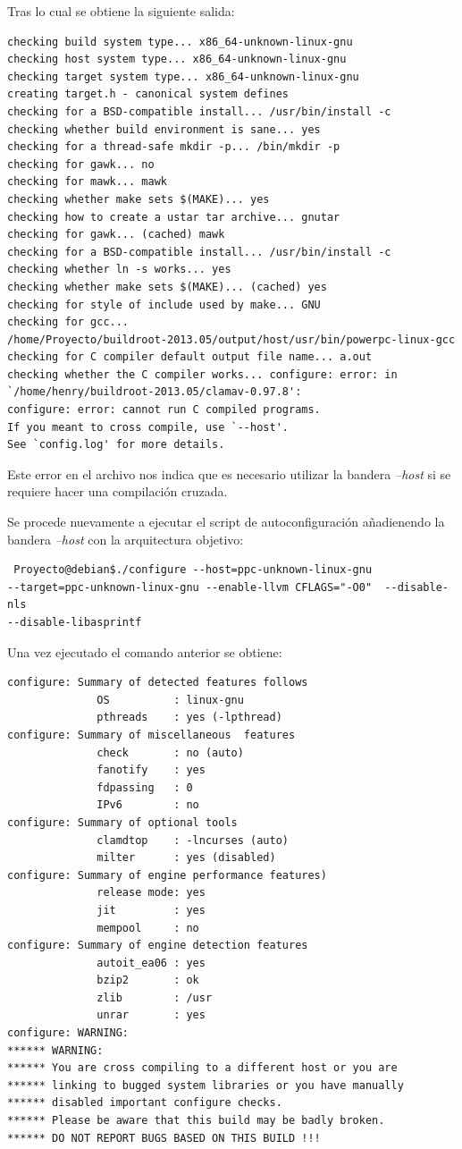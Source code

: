 Tras lo cual se obtiene la siguiente salida:
\begin{verbatim}
checking build system type... x86_64-unknown-linux-gnu
checking host system type... x86_64-unknown-linux-gnu
checking target system type... x86_64-unknown-linux-gnu
creating target.h - canonical system defines
checking for a BSD-compatible install... /usr/bin/install -c
checking whether build environment is sane... yes
checking for a thread-safe mkdir -p... /bin/mkdir -p
checking for gawk... no
checking for mawk... mawk
checking whether make sets $(MAKE)... yes
checking how to create a ustar tar archive... gnutar
checking for gawk... (cached) mawk
checking for a BSD-compatible install... /usr/bin/install -c
checking whether ln -s works... yes
checking whether make sets $(MAKE)... (cached) yes
checking for style of include used by make... GNU
checking for gcc... 
/home/Proyecto/buildroot-2013.05/output/host/usr/bin/powerpc-linux-gcc
checking for C compiler default output file name... a.out
checking whether the C compiler works... configure: error: in 
`/home/henry/buildroot-2013.05/clamav-0.97.8':
configure: error: cannot run C compiled programs.
If you meant to cross compile, use `--host'.
See `config.log' for more details.
\end{verbatim}


Este error en el archivo nos indica que  es necesario utilizar la bandera 
\emph{--host} si se requiere hacer una compilación cruzada.

Se procede nuevamente a  ejecutar el script  de autoconfiguración añadienendo 
la bandera \emph{--host} con la arquitectura objetivo:

\begin{verbatim}
 Proyecto@debian$./configure --host=ppc-unknown-linux-gnu 
--target=ppc-unknown-linux-gnu --enable-llvm CFLAGS="-O0"  --disable-nls 
--disable-libasprintf

\end{verbatim}


Una vez ejecutado el comando anterior se obtiene:

\begin{verbatim}
configure: Summary of detected features follows
              OS          : linux-gnu
              pthreads    : yes (-lpthread)
configure: Summary of miscellaneous  features
              check       : no (auto)
              fanotify    : yes
              fdpassing   : 0
              IPv6        : no
configure: Summary of optional tools
              clamdtop    : -lncurses (auto)
              milter      : yes (disabled)
configure: Summary of engine performance features)
              release mode: yes
              jit         : yes
              mempool     : no
configure: Summary of engine detection features
              autoit_ea06 : yes
              bzip2       : ok
              zlib        : /usr
              unrar       : yes
configure: WARNING:
****** WARNING:
****** You are cross compiling to a different host or you are
****** linking to bugged system libraries or you have manually
****** disabled important configure checks.
****** Please be aware that this build may be badly broken.
****** DO NOT REPORT BUGS BASED ON THIS BUILD !!!


\end{verbatim}

